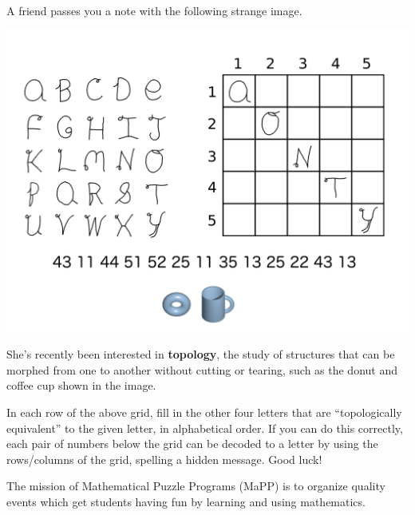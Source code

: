 \documentclass{puzzlehunt}
\title{\phEventName}
\author{Mathematical Puzzle Programs}
\date{\today}
\begin{document}

A friend passes you a note with the following strange image.

\includegraphics[width=0.9\linewidth]{assets/topology-puzzle.png}

She's recently been interested in \textbf{topology}, the study of structures
that can be morphed from one to another without cutting or tearing, such as
the donut and coffee cup shown in the image.

In each row of the above grid, fill in the other four letters that
are ``topologically equivalent'' to the given letter, in alphabetical
order. If you can do this correctly, each pair of numbers below the grid
can be decoded to a letter by using the rows/columns of the grid, spelling
a hidden message. Good luck!


The mission of Mathematical Puzzle Programs (MaPP) is to organize quality events
which get students having fun by learning and using mathematics.
\end{document}
